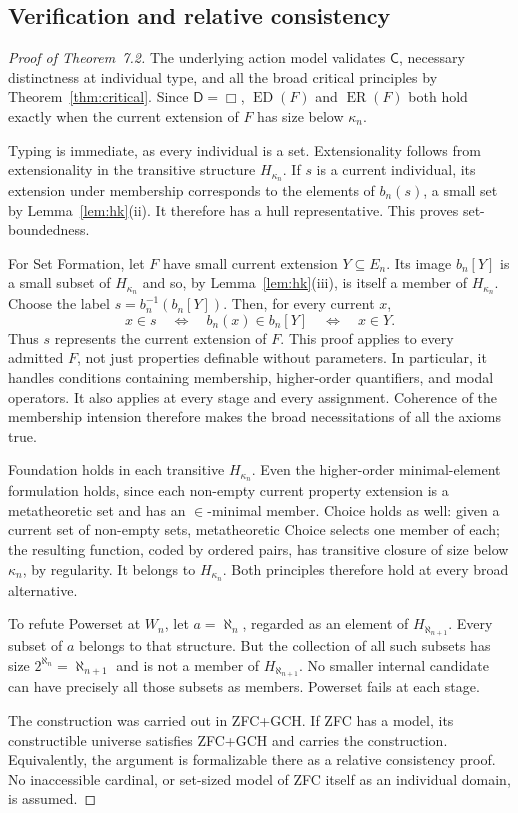 \documentclass[11pt]{article}
\theoremstyle{definition}
\newcommand{\D}{\mathsf D}
\newcommand{\ED}{\operatorname{ED}}
\newcommand{\ER}{\operatorname{ER}}
\newcommand{\C}{\mathsf C}
\numberwithin{equation}{section}
\begin{document}
\subsection{Verification and relative consistency}

\begin{proof}[Proof of Theorem~7.2]
The underlying action model validates $\C$, necessary distinctness at individual type, and all the broad critical principles by Theorem~\ref{thm:critical}. Since $\D =\Box$, $\ED(F)$ and $\ER(F)$ both hold exactly when the current extension of $F$ has size below $\kappa_n$.

Typing is immediate, as every individual is a set. Extensionality follows from extensionality in the transitive structure $H_{\kappa_n}$. If $s$ is a current individual, its extension under membership corresponds to the elements of $b_n(s)$, a small set by Lemma~\ref{lem:hk}(ii). It therefore has a hull representative. This proves set-boundedness.

For Set Formation, let $F$ have small current extension $Y\subseteq E_n$. Its image $b_n[Y]$ is a small subset of $H_{\kappa_n}$ and so, by Lemma~\ref{lem:hk}(iii), is itself a member of $H_{\kappa_n}$. Choose the label $s=b_n^{-1}(b_n[Y])$. Then, for every current $x$,
$$
x\in s\quad\Longleftrightarrow\quad
b_n(x)\in b_n[Y]\quad\Longleftrightarrow\quad x\in Y.
$$
Thus $s$ represents the current extension of $F$. This proof applies to every admitted $F$, not just properties definable without parameters. In particular, it handles conditions containing membership, higher-order quantifiers, and modal operators. It also applies at every stage and every assignment. Coherence of the membership intension therefore makes the broad necessitations of all the axioms true.

Foundation holds in each transitive $H_{\kappa_n}$. Even the higher-order minimal-element formulation holds, since each non-empty current property extension is a metatheoretic set and has an $\in$-minimal member. Choice holds as well: given a current set of non-empty sets, metatheoretic Choice selects one member of each; the resulting function, coded by ordered pairs, has transitive closure of size below $\kappa_n$, by regularity. It belongs to $H_{\kappa_n}$. Both principles therefore hold at every broad alternative.

To refute Powerset at $W_n$, let $a=\aleph_n$, regarded as an element of $H_{\aleph_{n+1}}$. Every subset of $a$ belongs to that structure. But the collection of all such subsets has size $2^{\aleph_n}=\aleph_{n+1}$ and is not a member of $H_{\aleph_{n+1}}$. No smaller internal candidate can have precisely all those subsets as members. Powerset fails at each stage.

The construction was carried out in ZFC+GCH. If ZFC has a model, its constructible universe satisfies ZFC+GCH and carries the construction. Equivalently, the argument is formalizable there as a relative consistency proof. No inaccessible cardinal, or set-sized model of ZFC itself as an individual domain, is assumed.
\end{proof}
\end{document}
